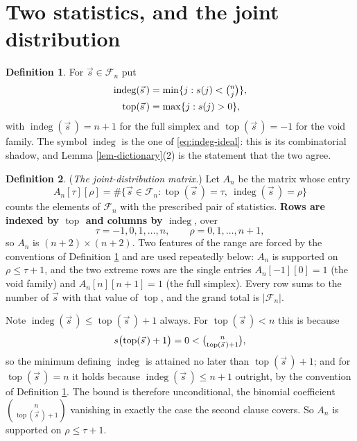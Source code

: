 \documentclass[11pt, a4paper, abstract=yes]{scrartcl}
\theoremstyle{definition}
\newtheorem{definition}{Definition}
\theoremstyle{remark}
\theoremstyle{plain}
\newcommand{\indeg}{\operatorname{indeg}}
\newcommand{\tp}{\operatorname{top}}
\begin{document}
\section{Two statistics, and the joint distribution}
\label{sec-statistics}
\begin{definition}
For \(\vec s\in\mathcal F_n\) put
\begin{align}
  \indeg(\vec s\,) &= \min\lbrace j:s(j)<\tbinom nj\rbrace,\label{eq:def-indeg}\\
  \tp(\vec s\,) &= \max\lbrace j:s(j)>0\rbrace,\label{eq:def-top}
\end{align}
with \(\indeg(\vec s\,)=n+1\) for the full simplex and \(\tp(\vec s\,)=-1\) for the void family. The
symbol \(\indeg\) is the one of \eqref{eq:indeg-ideal}: this is its combinatorial shadow, and
Lemma \ref{lem-dictionary}(2) is the statement that the two agree.
\label{def-stats}
\end{definition}

\begin{definition}
(\emph{The joint-distribution matrix.}) Let \(A_n\) be the matrix whose entry
\begin{equation}\label{eq:def-A}
  A_n[\tau][\rho]=\#\bigl\lbrace \vec s\in\mathcal F_n:\tp(\vec s\,)=\tau,\ \indeg(\vec s\,)=\rho\bigr\rbrace
\end{equation}
counts the elements of \(\mathcal F_n\) with the prescribed pair of statistics. \textbf{Rows are indexed by
\(\tp\) and columns by \(\indeg\)}, over
\begin{equation}\label{eq:def-A-range}
  \tau=-1,0,1,\dots,n,\qquad \rho=0,1,\dots,n+1 ,
\end{equation}
so \(A_n\) is \((n+2)\times(n+2)\). Two features of the range are forced by the conventions of
Definition \ref{def-stats} and are used repeatedly below: \(A_n\) is supported on \(\rho\le\tau+1\), and
the two extreme rows are the single entries \(A_n[-1][0]=1\) (the void family) and \(A_n[n][n+1]=1\)
(the full simplex). Every row sums to the number of \(\vec s\) with that value of \(\tp\), and the
grand total is \(\lvert\mathcal F_n\rvert\).
\label{def-A}
\end{definition}

Note \(\indeg(\vec s\,)\le\tp(\vec s\,)+1\) always. For \(\tp(\vec s\,)<n\) this is because
\begin{equation}\label{eq:indeg-le-top}
  s\bigl(\tp(\vec s\,)+1\bigr)=0<\tbinom n{\tp(\vec s\,)+1},
\end{equation}
so the minimum defining \(\indeg\) is attained no later
than \(\tp(\vec s\,)+1\); and for \(\tp(\vec s\,)=n\) it holds because \(\indeg(\vec s\,)\le n+1\) outright, by
the convention of Definition \ref{def-stats}. The bound is therefore unconditional, the binomial
coefficient \(\binom n{\tp(\vec s\,)+1}\) vanishing in exactly the case the second clause covers. So
\(A_n\) is supported on \(\rho\le\tau+1\).
\end{document}
